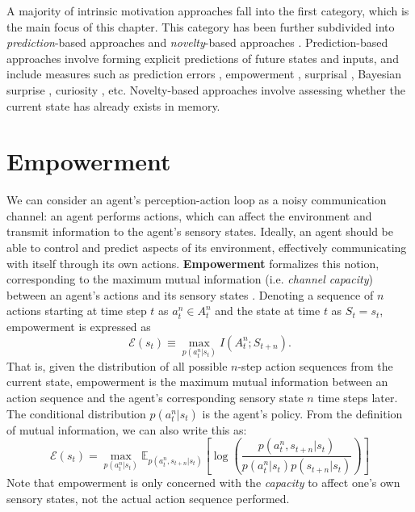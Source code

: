 A majority of intrinsic motivation approaches fall into the first category, which is the main focus of this chapter. This category has been further subdivided into \textit{prediction}-based approaches and \textit{novelty}-based approaches \cite{mirolli2013intrinsically}. Prediction-based approaches involve forming explicit predictions of future states and inputs, and include measures such as prediction errors \cite{nelson2005finding, barto2004intrinsically}, empowerment \cite{klyubin2005empowerment, mohamed2015variational}, surprisal \cite{friston2015active}, Bayesian surprise \cite{itti2006bayesian}, curiosity \cite{schmidhuber2010formal}, etc. Novelty-based approaches involve assessing whether the current state has already exists in memory.

\section{Empowerment}

We can consider an agent's perception-action loop as a noisy communication channel: an agent performs actions, which can affect the environment and transmit information to the agent's sensory states. Ideally, an agent should be able to control and predict aspects of its environment, effectively communicating with itself through its own actions. \textbf{Empowerment} formalizes this notion, corresponding to the maximum mutual information (i.e. \textit{channel capacity}) between an agent's actions and its sensory states \cite{klyubin2005empowerment}. Denoting a sequence of $n$ actions starting at time step $t$ as $a^n_t \in A^n_t$ and the state at time $t$ as $S_t = s_t$, empowerment is expressed as
\begin{equation}
    \mathcal{E} (s_t) \equiv \max_{p (a^n_t | s_t)} I(A^n_t; S_{t+n}).
    \label{eq: empowerment def}
\end{equation}
\noindent That is, given the distribution of all possible  $n$-step action sequences from the current state, empowerment is the maximum mutual information between an action sequence and the agent's corresponding sensory state $n$ time steps later. The conditional distribution $p (a^n_t | s_t)$ is the agent's policy. From the definition of mutual information, we can also write this as:
\begin{equation}
    \mathcal{E} (s_t) = \max_{p (a^n_t | s_t)} \mathbb{E}_{p(a^n_t , s_{t+n} | s_t)} \left[ \log \left( \frac{p(a^n_t , s_{t+n} | s_t)}{p (a^n_t | s_t) p (s_{t+n} | s_t)} \right) \right]
    \label{eq: empowerment def 2}
\end{equation}
Note that empowerment is only concerned with the \textit{capacity} to affect one's own sensory states, not the actual action sequence performed. 

